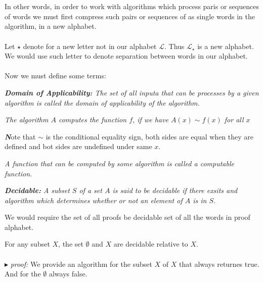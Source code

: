 \documentclass[10pt,a4paper]{article}
\newenvironment{callout}
	{\begin{calloutbox}\color{charcoal}\textbf\textit}
	{\end{calloutbox}}
\newcommand{\curveL}{\mathcal{L}}
\newcommand{\proof}{\\ \ \\ $\blacktriangleright$ \textit{proof: }}
\begin{document}
                        \\
                        \\
                        In other words, in order to work with algorithms which process paris or sequences of words we must first compress such pairs or sequences of as single words in the algorithm, in a new alphabet.
                        \\
                        \\
                        Let $\star$ denote for a new letter not in our alphabet $\curveL$. Thus $\curveL_\star$ is a new alphabet. We would use such letter to denote separation between words in our alphabet.
                        \\
                        \\
                        Now we must define some terms:
                        \begin{define}
                            \textit{\textbf{Domain of Applicability:} The set of all inputa that can be processes by a given algorithm is called the domain of applicability of the algorithm.}
                        \end{define}
                        \begin{define}
                            \textit{The algorithm $A$ computes the function $f$, if we have $A(x)\sim f(x)$ for all $x$}
                        \end{define}
                        \begin{callout}
                            Note that $\sim$ is the conditional equality sign, both sides are equal when they are defined and bot sides are undefined under same $x$.
                        \end{callout}
                        \begin{define}
                            \textit{A function that can be computed by some algorithm is called a computable function.}
                        \end{define}
                        \begin{define}
                            \textit{\textbf{Decidable:} A subset $S$ of a set $A$ is said to be decidable if there exsits and algorithm which determines whether or not an element of $A$ is in $S$.}
                        \end{define}
                        We would require the set of all proofs be decidable set of all the words in proof alphabet. 
                        \begin{lemma}
                            For any subset $X$, the set $\emptyset$ and $X$ are decidable relative to $X$.
                            \proof We provide an algorithm for the subset $X$ of $X$ that always returnes true. And for the $\emptyset$ always false.
                        \end{lemma}
\end{document}
